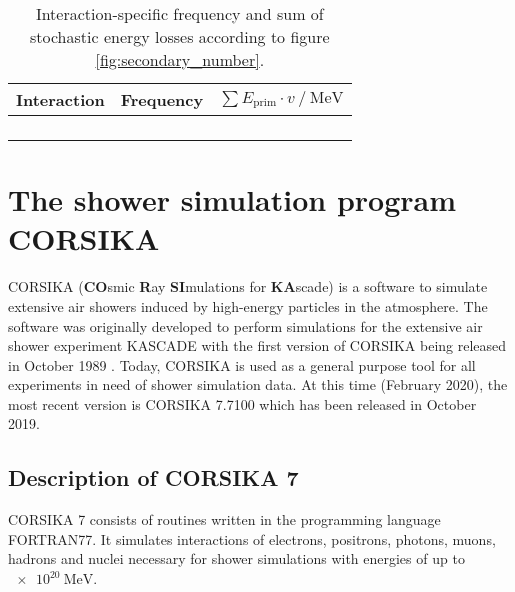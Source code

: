 \begin{table}
	\centering
	\caption[]{Interaction-specific frequency and sum of stochastic energy losses according to figure \ref{fig:secondary_number}.}
	\label{tab:secondary_number}
	\begin{tabular}{l S S}
		\toprule
		{Interaction} & {Frequency} & {$\sum E_\text{prim} \cdot v \:/\: \si{\mega\electronvolt}$} \\	
		\midrule
		 & \epaircount & \epairsum \\
		 & \bremscount & \bremssum \\
		 & \photocount & \photosum \\
		 & \ionizcount & \ionizsum \\
		\bottomrule
	\end{tabular}
\end{table}


\section{The shower simulation program CORSIKA}

CORSIKA (\textbf{CO}smic \textbf{R}ay \textbf{SI}mulations for \textbf{KA}scade) is a software to simulate extensive air showers induced by high-energy particles in the atmosphere.
The software was originally developed to perform simulations for the extensive air shower experiment KASCADE with the first version of CORSIKA being released in October 1989 \cite{userguide}.
Today, CORSIKA is used as a general purpose tool for all experiments in need of shower simulation data.
At this time (February 2020), the most recent version is CORSIKA 7.7100 which has been released in October 2019.

\subsection{Description of CORSIKA 7}

CORSIKA 7 consists of routines written in the programming language FORTRAN77.
It simulates interactions of electrons, positrons, photons, muons, hadrons and nuclei necessary for shower simulations with energies of up to $\SI{e20}{\mega\electronvolt}$.

